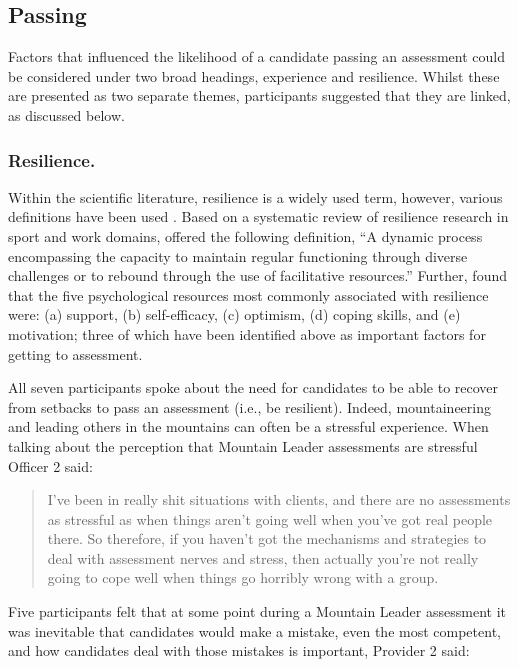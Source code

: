\documentclass[
  12pt,
  a4paper,
]{book}
\begin{document}
\hypertarget{passing}{%
\subsection{Passing}\label{passing}}

Factors that influenced the likelihood of a candidate passing an assessment could be considered under two broad headings, experience and resilience. Whilst these are presented as two separate themes, participants suggested that they are linked, as discussed below.

\hypertarget{qual-passing-resilience}{%
\subsubsection{Resilience.}\label{qual-passing-resilience}}

Within the scientific literature, resilience is a widely used term, however, various definitions have been used \citep[cf.~][]{Fletcher2013}. Based on a systematic review of resilience research in sport and work domains, \citet{Bryan2017} offered the following definition, ``A dynamic process encompassing the capacity to maintain regular functioning through diverse challenges or to rebound through the use of facilitative resources.'' Further, \citet{Bryan2017} found that the five psychological resources most commonly associated with resilience were: (a) support, (b) self-efficacy, (c) optimism, (d) coping skills, and (e) motivation; three of which have been identified above as important factors for getting to assessment.

All seven participants spoke about the need for candidates to be able to recover from setbacks to pass an assessment (i.e., be resilient). Indeed, mountaineering and leading others in the mountains can often be a stressful experience. When talking about the perception that Mountain Leader assessments are stressful Officer 2 said:

\begin{quote}
I've been in really shit situations with clients, and there are no assessments as stressful as when things aren't going well when you've got real people there. So therefore, if you haven't got the mechanisms and strategies to deal with assessment nerves and stress, then actually you're not really going to cope well when things go horribly wrong with a group.
\end{quote}

Five participants felt that at some point during a Mountain Leader assessment it was inevitable that candidates would make a mistake, even the most competent, and how candidates deal with those mistakes is important, Provider 2 said:
\end{document}
